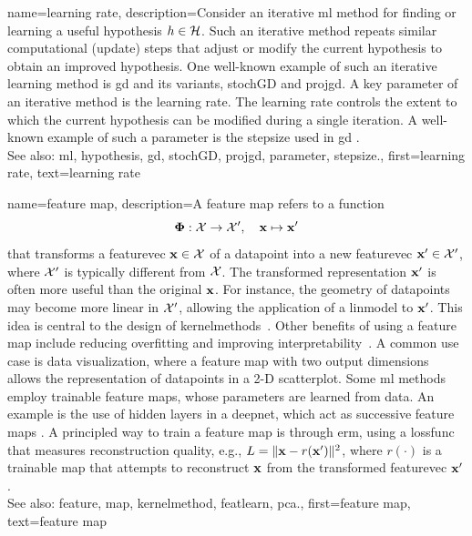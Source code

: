 {name={learning rate}, 
	description={Consider 
		an iterative \gls{ml} method for finding or learning a useful \gls{hypothesis} $h \in \mathcal{H}$. 
		Such an iterative method repeats similar computational (update) steps that adjust or 
		modify the current \gls{hypothesis} to obtain an improved \gls{hypothesis}. One 
		well-known example of such an iterative learning method is \gls{gd} and its variants, \gls{stochGD} and 
		\gls{projgd}. A key \gls{parameter} of an iterative method is the learning rate. 
		The learning rate controls the extent to which the current \gls{hypothesis} 
		can be modified during a single iteration. A well-known example of such a \gls{parameter} 
		is the \gls{stepsize} used in \gls{gd} \cite[Ch. 5]{MLBasics}.
				\\
		See also: \gls{ml}, \gls{hypothesis}, \gls{gd}, \gls{stochGD}, \gls{projgd}, \gls{parameter}, \gls{stepsize}.},
	first={learning rate},
	text={learning rate} 
}

{name={feature map}, 
	description={A \gls{feature} \gls{map} refers to a \gls{function} 
		$$
		{\bf \Phi}: \mathcal{X} \rightarrow \mathcal{X}', \quad {\bf x} \mapsto {\bf x}'
		$$
		that transforms a \gls{featurevec} ${\bf x} \in \mathcal{X}$ of 
 		a \gls{datapoint} into a new \gls{featurevec} ${\bf x}' \in \mathcal{X}'$, 
 		where $\mathcal{X}'$ is typically different from $\mathcal{X}$.
 		The transformed representation ${\bf x}'$ is often more useful than the original 
 		${\bf x}$. For instance, the geometry of \glspl{datapoint} may become more linear 
 		in $\mathcal{X}'$, allowing the application of a \gls{linmodel} to ${\bf x}'$. 
 		This idea is central to the design of \glspl{kernelmethod}~\cite{LearningKernelsBook}.
 		Other benefits of using a \gls{feature} \gls{map} include reducing \gls{overfitting} and 
 		improving \gls{interpretability}~\cite{Ribeiro2016}. A common use case is \gls{data} 
 		visualization, where a \gls{feature} \gls{map} with two output dimensions allows the representation 
 		of \glspl{datapoint} in a 2-D \gls{scatterplot}. Some \gls{ml} methods employ trainable 
 		\gls{feature} \glspl{map}, whose \glspl{parameter} are learned from \gls{data}. An example is 
 		the use of hidden \glspl{layer} in a \gls{deepnet}, which act as successive \gls{feature} \glspl{map} 
 		\cite{MallatUnderstandingDeepLearning}. A principled way to train a \gls{feature} \gls{map} 
 		is through \gls{erm}, using a \gls{lossfunc} that measures reconstruction quality, 
 		e.g., $L = \|{\bf x} - r({\bf x}')\|^2$, where $r(\cdot)$ is a trainable
 		\gls{map} that attempts to reconstruct ${\bf x}$ from the transformed \gls{featurevec} ${\bf x}'$.
				\\
		See also: \gls{feature}, \gls{map}, \gls{kernelmethod}, \gls{featlearn}, \gls{pca}.},
	first={feature map},
	text={feature map} 
}
	
